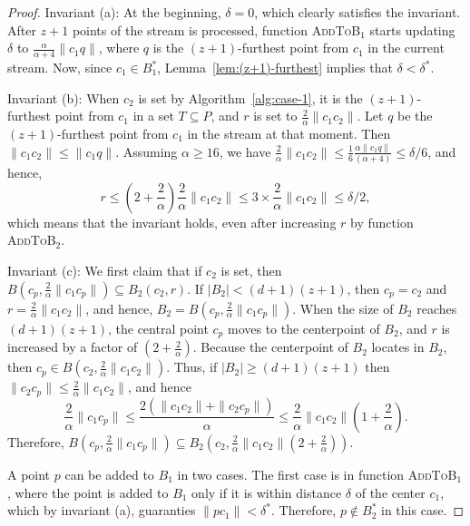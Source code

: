 \documentclass[envcountsame]{cls/cccg15}
\newcommand{\rc}{r}
\newcommand{\cp}{c_p}
\newcommand{\dz}{(d + 1)(z + 1)}
\newcommand{\textproc}{\textsc}
\newcommand{\len}[1]{\|{#1}\|}
\newcommand{\radius}[1]{\frac{2}{\alpha} \len{c_1 #1}}
\newcommand{\lee}{\leqslant}
\newcommand{\gee}{\geqslant}
\renewcommand{\leq}{\lee}
\renewcommand{\ge}{\gee}
\begin{document}
\begin{proof} 
Invariant (a): 
At the beginning, $\delta = 0$, which clearly satisfies the invariant.
After $z+1$ points of the stream is processed, 
function \textproc{AddToB$_1$} starts updating $\delta$
to $\frac{\alpha}{\alpha+4}\len{c_1q}$,
where $q$ is the $(z+1)$-furthest point from $c_1$ in the current stream.
Now, since $c_1 \in B_1^*$, Lemma~\ref{lem:(z+1)-furthest}
implies that $\delta < \delta^*$.

Invariant (b): 
When $c_2$ is set by Algorithm~\ref{alg:case-1}, 
it is the $(z+1)$-furthest point from $c_1$ in a set $T \subseteq P$,
and $\rc$ is set to $\frac{2}{\alpha}\len{c_1c_2}$.
Let $q$ be the $(z+1)$-furthest point from $c_1$ in the stream at that moment.
Then $\len{c_1c_2} \leq \len{c_1q}$.
Assuming $\alpha \ge 16$, we have 
$\radius{c_2} \leq \frac{1}{6}\frac{\alpha \len{c_1 q}}{(\alpha + 4)} \leq \delta / 6$, 
and hence,  
$$
	r \leq (2 + \frac{2}{\alpha})\radius{c_2} \leq 3 \times \radius{c_2}  \leq \delta /2,
$$
which means that the invariant holds, 
even after increasing $r$ by function \textproc{AddToB$_2$}.


Invariant (c): 
We first claim that if $c_2$ is set, then
$B(c_p, \radius{c_p}) \subseteq B_2(c_2, r)$.
If $|B_2| < \dz$, then $c_p = c_2$ and $r = \radius{c_2}$, 
and hence, $B_2 = B(c_p, \radius{c_p})$. 
When the size of $B_2$ reaches $\dz$, 
the central point $\cp$ moves to the centerpoint of $B_2$,
and $\rc$ is increased by a factor of $(2 + \frac{2}{\alpha})$. 
Because the centerpoint of $B_2$ locates in $B_2$, then $c_p \in B(c_2, \radius{c_2})$.
Thus, if $|B_2| \ge \dz$ then $\len{c_2 c_p} \leq \radius{c_2}$, and hence
$$
	\radius{c_p} \leq \frac{2 (\len{c_1 c_2} + \len{c_2 c_p})}{\alpha} \leq \radius{c_2}(1 + \frac{2}{\alpha}).
$$ 
Therefore, $B(c_p, \radius{c_p}) \subseteq B_2(c_2, \radius{c_2}(2 + \frac{2}{\alpha}))$.

A point $p$ can be added to $B_1$ in two cases. %
The first case is in function \textproc{AddToB$_1$}, 
where the point is added to $B_1$ only if it is within distance $\delta$ of the center $c_1$,  
which by invariant (a), 
guaranties $\len{pc_1} < \delta^*$. Therefore, $p \not \in B_2^*$ in this case.


\end{proof}
\end{document}
